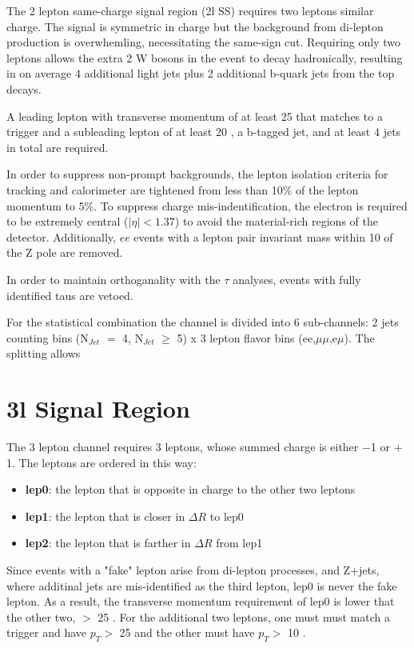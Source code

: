 The 2 lepton same-charge signal region (2l SS) requires two leptons similar charge. The signal is symmetric in charge but
the background from \ttbar di-lepton production is overwhemling, necessitating the same-sign cut. Requiring
only two leptons allows the extra 2 W bosons in the event to decay hadronically, resulting in on average 4 additional
light jets plus 2 additional b-quark jets from the top decays. 

A leading lepton with transverse momentum of at least 25 \gevc that matches to a
trigger and a subleading lepton of at least 20 \gevc, a b-tagged jet, and at least 4 jets in
total are required.  

In order to suppress non-prompt backgrounds, the lepton isolation criteria for tracking and 
calorimeter are tightened from less than 10\% of the lepton momentum to 5\%. To suppress
charge mis-indentification, the electron is required to be extremely central ($|\eta| < 1.37$) 
to avoid the material-rich regions of the detector. Additionally, $ee$ events with a 
lepton pair invariant mass within 10 \gevcc of the Z pole are removed. 

In order to maintain orthoganality with the $\tau$ analyses, events with fully identified
taus are vetoed.

For the statistical combination the channel is divided into 6 sub-channels:
2 jets counting bins (N$_{Jet}$ $=$ 4, N$_{Jet}$ $\geq$ 5) x 3 lepton flavor bins (ee,$\mu\mu$,e$\mu$). 
The splitting allows

\section{3l Signal Region}

The 3 lepton channel requires 3 leptons, whose summed charge is either
$-$1 or $+$1. 
The leptons are ordered in this way:

\begin{itemize}
\item {\bf lep0}: the lepton that is opposite in charge to the other two leptons
\item {\bf lep1}: the lepton that is closer in $\Delta R$ to lep0
\item {\bf lep2}: the lepton that is farther in $\Delta R$ from lep1
\end{itemize}

Since events with a "fake" lepton arise from di-lepton processes, \ttbar and Z+jets, where additinal jets are 
mis-identified as the third lepton, lep0 is never the fake lepton. As a result, the transverse momentum 
requirement of lep0 is lower that the other two, $>$ 25 \gevc. For the additional two leptons, one must
must match a trigger and have $p_T >$ 25 \gevc and the other must have $p_T >$ 10 \gevc. 


